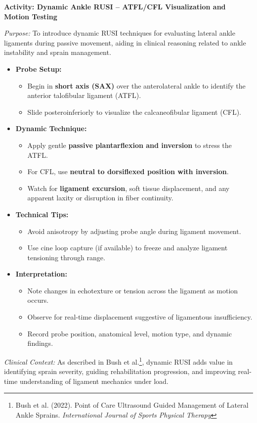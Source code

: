 \begin{labactivitybox}
\textbf{Activity: Dynamic Ankle RUSI – ATFL/CFL Visualization and Motion Testing}

\textit{Purpose:} To introduce dynamic RUSI techniques for evaluating lateral ankle ligaments during passive movement, aiding in clinical reasoning related to ankle instability and sprain management.

\begin{itemize}
  \item \textbf{Probe Setup:}
  \begin{itemize}
    \item Begin in \textbf{short axis (SAX)} over the anterolateral ankle to identify the anterior talofibular ligament (ATFL).
    \item Slide posteroinferiorly to visualize the calcaneofibular ligament (CFL).
  \end{itemize}
  
  \item \textbf{Dynamic Technique:}
  \begin{itemize}
    \item Apply gentle \textbf{passive plantarflexion and inversion} to stress the ATFL.
    \item For CFL, use \textbf{neutral to dorsiflexed position with inversion}.
    \item Watch for \textbf{ligament excursion}, soft tissue displacement, and any apparent laxity or disruption in fiber continuity.
  \end{itemize}
  
  \item \textbf{Technical Tips:}
  \begin{itemize}
    \item Avoid anisotropy by adjusting probe angle during ligament movement.
    \item Use cine loop capture (if available) to freeze and analyze ligament tensioning through range.
  \end{itemize}

  \item \textbf{Interpretation:}
  \begin{itemize}
    \item Note changes in echotexture or tension across the ligament as motion occurs.
    \item Observe for real-time displacement suggestive of ligamentous insufficiency.
    \item Record probe position, anatomical level, motion type, and dynamic findings.
  \end{itemize}
\end{itemize}

\textit{Clinical Context:} As described in Bush et al.\footnote{Bush et al. (2022). Point of Care Ultrasound Guided Management of Lateral Ankle Sprains. \textit{International Journal of Sports Physical Therapy}}, dynamic RUSI adds value in identifying sprain severity, guiding rehabilitation progression, and improving real-time understanding of ligament mechanics under load.
\end{labactivitybox}

